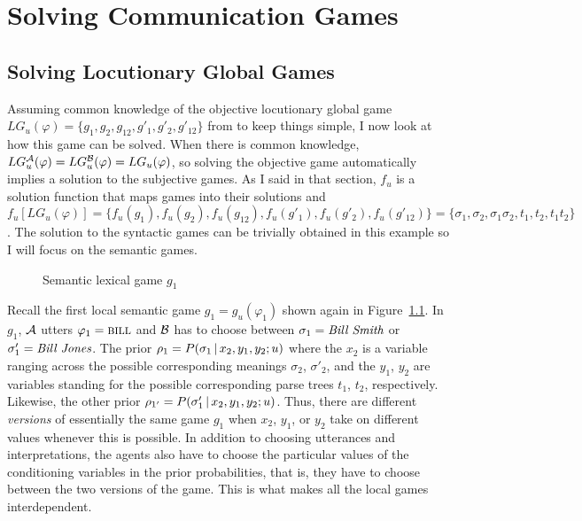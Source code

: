 \chapter{Solving Communication Games}
\section{Solving Locutionary Global Games} \label{sec:solving locutionary global games}

Assuming common knowledge of the objective locutionary global game $LG_u(\varphi)\allowbreak = \{g_1, g_2, g_{12}, g'_1, g'_2, g'_{12}\}$ from  to keep things simple, I now look at how this game can be solved. When there is common knowledge, $LG^{\cal A}_u(\varphi) = LG^{\cal B}_u(\varphi) = LG_u(\varphi)$, so solving the objective game automatically implies a solution to the subjective games. As I said in that section, $f_u$ is a solution function that maps games into their solutions and  $f_u[LG_u(\varphi)] = \{f_u(g_1), f_u(g_2), f_u(g_{12}),\allowbreak f_u(g'_1), f_u(g'_2),\allowbreak f_u(g'_{12})\} = \{\sigma_1, \sigma_2, \sigma_1\sigma_2, t_1, t_2, t_1t_2\}$. The solution to the syntactic games can be trivially obtained in this example so I will focus on the semantic games.

\begin{figure}[h] 

\caption{Semantic lexical game $g_1$}
\label{fig:semantic lexical game g1 again}
\end{figure}

Recall the first local semantic game $g_1 = g_u(\varphi_1)$ shown again in Figure~\ref{fig:semantic lexical game g1 again}. In $g_1$, $\cal A$ utters $\varphi_1 = \Expression{bill}$ and $\cal B$ has to choose between $\sigma_1 = \emph{Bill Smith}$ or $\sigma'_1 = \emph{Bill Jones}$. The prior $\rho_1 = P(\sigma_1 \,|\, x_2, y_1, y_2; u)$ where the $x_2$ is a variable ranging across the possible corresponding meanings $\sigma_2$, $\sigma'_2$, and the $y_1$, $y_2$ are variables standing for the possible corresponding parse trees $t_1$, $t_2$, respectively. Likewise, the other prior 
$\rho_{1'} = P(\sigma'_1 \,|\, x_2, y_1, y_2; u)$. Thus, there are different \emph{versions} of essentially the same game $g_1$ when $x_2$, $y_1$, or $y_2$ take on different values whenever this is possible. In addition to choosing utterances and interpretations, the agents also have to choose the particular values of the conditioning variables in the prior probabilities, that is, they have to choose between the two versions of the game. This is what makes all the local games interdependent.

